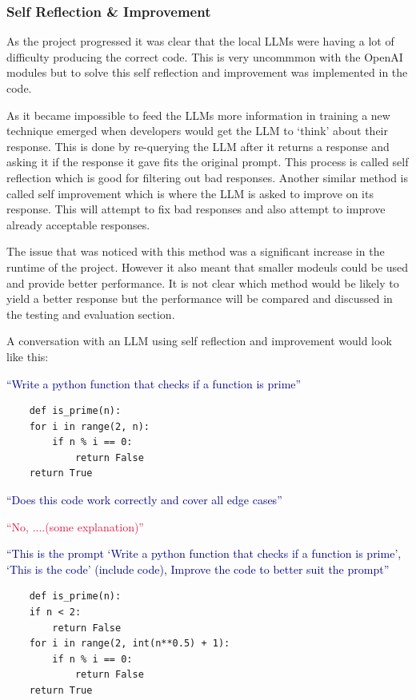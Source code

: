 \documentclass[12pt]{extarticle}
\begin{document}
\subsubsection{Self Reflection \& Improvement}

As the project progressed it was clear that the local LLMs were having a lot of difficulty producing the correct code. This is very uncommmon with the OpenAI modules but to solve this self reflection and improvement was implemented in the code. 

As it became impossible to feed the LLMs more information in training a new technique emerged when developers would get the LLM to `think' about their response. This is done by re-querying the LLM after it returns a response and asking it if the response it gave fits the original prompt. This process is called self reflection \cite{shinn2023} which is good for filtering out bad responses. Another similar method is called self improvement which is where the LLM is asked to improve on its response. This will attempt to fix bad responses and also attempt to improve already acceptable responses.

The issue that was noticed with this method was a significant increase in the runtime of the project. However it also meant that smaller modeuls could be used and provide better performance. It is not clear which method would be likely to yield a better response but the performance will be compared and discussed in the testing and evaluation section.

A conversation with an LLM using self reflection and improvement would look like this:

\textcolor{navy}{``Write a python function that checks if a function is prime''}

\begin{lstlisting}
    def is_prime(n):
    for i in range(2, n):
        if n % i == 0:
            return False
    return True  
\end{lstlisting}

\textcolor{navy}{``Does this code work correctly and cover all edge cases''}

\textcolor{crimson}{``No, ....(some explanation)''}

\textcolor{navy}{``This is the prompt `Write a python function that checks if a function is prime', `This is the code' (include code), Improve the code to better suit the prompt''}

\begin{lstlisting}
    def is_prime(n):
    if n < 2:
        return False
    for i in range(2, int(n**0.5) + 1):
        if n % i == 0:
            return False
    return True
\end{lstlisting}
\end{document}
